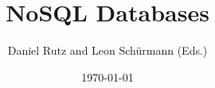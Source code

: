 \documentclass[
  12pt,
  a4paper,
  parskip,
  openany
]{scrbook}
\title{NoSQL Databases}
\author{Daniel Rutz and Leon Schürmann (Eds.)}
\date{\today}
\begin{document}
\maketitle
\tableofcontents

\printglossaries





\printbibliography

\appendix

\end{document}
